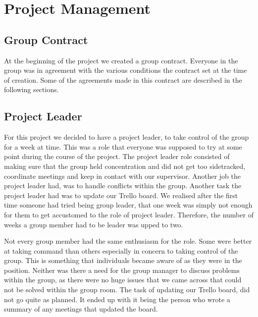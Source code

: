 \documentclass{article}
\begin{document}
\section{Project Management}
\subsection{Group Contract}
At the beginning of the project we created a group contract. 
Everyone in the group was in agreement with the various conditions the contract set at the time of creation. 
Some of the agreements made in this contract are described in the following sections.

\subsection{Project Leader}
For this project we decided to have a project leader, to take control of the group for a week at time. 
This was a role that everyone was supposed to try at some point during the course of the project. 
The project leader role consisted of making sure that the group held concentration and did not get too sidetracked, coordinate meetings and keep in contact with our supervisor. 
Another job the project leader had, was to handle conflicts within the group. 
Another task the project leader had was to update our Trello board.
We realised after the first time someone had tried being group leader, that one week was simply not enough for them to get accustomed to the role of project leader.
Therefore, the number of weeks a group member had to be leader was upped to two.

Not every group member had the same enthusiasm for the role. 
Some were better at taking command than others especially in concern to taking control of the group.
This is something that individuals became aware of as they were in the position.
Neither was there a need for the group manager to discuss problems within the group, as there were no huge issues that we came across that could not be solved within the group room.
The task of updating our Trello board, did not go quite as planned. 
It ended up with it being the person who wrote a summary of any meetings that updated the board.
\end{document}
